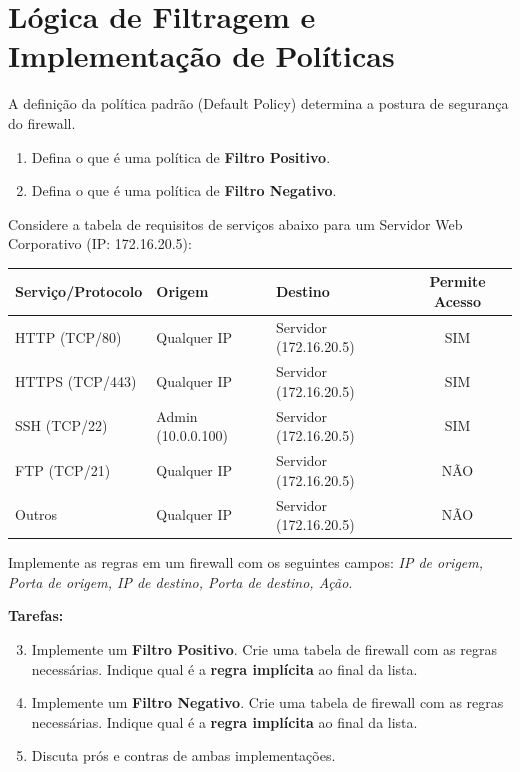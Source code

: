 \section{Lógica de Filtragem e Implementação de Políticas}
A definição da política padrão (Default Policy) determina a postura de segurança do firewall.

\begin{enumerate}
    \item Defina o que é uma política de \textbf{Filtro Positivo}.
    \item Defina o que é uma política de \textbf{Filtro Negativo}.
\end{enumerate}

Considere a tabela de requisitos de serviços abaixo para um Servidor Web Corporativo (IP: 172.16.20.5):

\begin{center}
    \begin{tabular}{|l|l|l|c|}
        \hline
        \textbf{Serviço/Protocolo} & \textbf{Origem}    & \textbf{Destino}       & \textbf{Permite Acesso} \\
        \hline
        HTTP (TCP/80)              & Qualquer IP        & Servidor (172.16.20.5) & SIM                     \\
        \hline
        HTTPS (TCP/443)            & Qualquer IP        & Servidor (172.16.20.5) & SIM                     \\
        \hline
        SSH (TCP/22)               & Admin (10.0.0.100) & Servidor (172.16.20.5) & SIM                     \\
        \hline
        FTP (TCP/21)               & Qualquer IP        & Servidor (172.16.20.5) & NÃO                     \\
        \hline
        Outros                     & Qualquer IP        & Servidor (172.16.20.5) & NÃO                     \\
        \hline
    \end{tabular}
\end{center}

Implemente as regras em um firewall com os seguintes campos: \textit{IP de origem, Porta de origem, IP de destino, Porta de destino, Ação}.

\textbf{Tarefas:}
\begin{enumerate}
    \setcounter{enumi}{2} %
    \item Implemente um \textbf{Filtro Positivo}. Crie uma tabela de firewall com as regras necessárias. Indique qual é a \textbf{regra implícita} ao final da lista.
    \item Implemente um \textbf{Filtro Negativo}. Crie uma tabela de firewall com as regras necessárias. Indique qual é a \textbf{regra implícita} ao final da lista.
    \item Discuta prós e contras de ambas implementações.
\end{enumerate}

